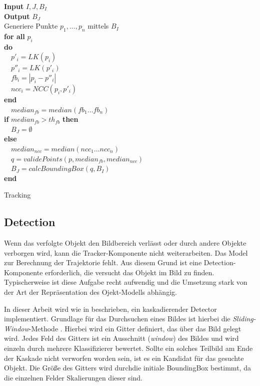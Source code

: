 \begin{algorithm}[h]
\textbf{Input} $I,J,B_{I}$ \\
\textbf{Output} $B_{J}$\\
Generiere Punkte $p_{1},\ldots,p_{n}$ mittels $B_{I}$\\
\textbf{for all} $p_{i}$\\
\textbf{do}\\
\ \ $p'_{i}=LK(p_{i})$\\
\ \ $p''_{i}=LK(p'_{i})$\\
\ \ $fb_{i}=|p_{i}-p''_{i}|$\\
\ \ $ncc_{i}=NCC(p_{i},p'_{i})$\\
\textbf{end}\\
\ \ $median_{fb}=median(fb_{1}\ldots fb_{n})$\\
\textbf{if} $median_{fb}>th{}_{fb}$ \textbf{then}\\
\ \ $B_{J}=\emptyset$\\
\textbf{else}\\
\ \ $median_{ncc}=median(ncc_{1}\dots ncc_{n})$\\
\ \ $q=validePoints(p,median_{fb},median_{ncc})$\\
\ \ $B_{J}=calcBoundingBox(q,B_{I})$\\
\textbf{end}
\caption{Tracking}
\label{Alg}
\end{algorithm}

\newpage{}

\subsection{Detection}
Wenn das verfolgte Objekt den Bildbereich verlässt oder durch andere Objekte verborgen wird, kann die Tracker-Komponente nicht weiterarbeiten. Das Model zur Berechnung der Trajektorie fehlt. Aus diesem Grund ist eine Detection-Komponente erforderlich, die versucht das Objekt im Bild zu finden. Typischerweise ist diese Aufgabe recht aufwendig und die Umsetzung stark von der Art der Repräsentation des Ojekt-Modells abhängig.

In dieser Arbeit wird wie in \cite{TLD} beschrieben, ein kaskadierender Detector implementiert. Grundlage für das Durchsuchen eines Bildes ist hierbei die \textit{Sliding-Window}-Methode \cite{key-6}. Hierbei wird ein Gitter definiert, das über das Bild gelegt wird. Jedes Feld des Gitters ist ein Ausschnitt (\textit{window}) des Bildes und wird einzeln durch mehrere Klassifizierer bewertet. Sollte ein solches Teilbild am Ende der Kaskade nicht verworfen worden sein, ist es ein Kandidat für das gesuchte Objekt. Die Größe des Gitters wird durchdie initiale BoundingBox bestimmt, da die einzelnen Felder Skalierungen dieser sind. 

